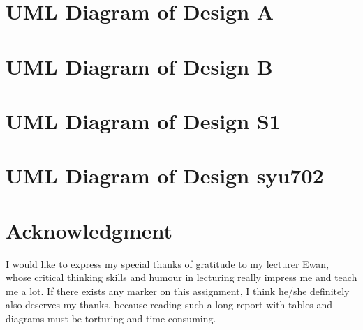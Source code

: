 \documentclass[conference]{IEEEtran}
\begin{document}
	
	
	
	\appendices 
	\clearpage
	\section{UML Diagram of Design A}
	\clearpage
	\section{UML Diagram of Design B}
	\clearpage
	\section{UML Diagram of Design S1}
	\clearpage
	\section{UML Diagram of Design syu702}
	\clearpage

	\section*{Acknowledgment}
	
	
	I would like to express my special thanks of gratitude to my lecturer Ewan, whose critical thinking skills and humour in lecturing really impress me and teach me a lot. If there exists any marker on this assignment, I think he/she definitely also deserves my thanks, because reading such a long report with tables and diagrams must be torturing and time-consuming.
	
	
	\printglossaries
	
	
	
	
	
	
	
	
	
	
\end{document}
